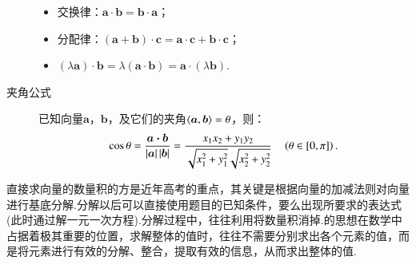 \begin{Theorem}[平面向量基本定理]
\begin{description}
        \begin{itemize}%
          \item 交换律：$\bm{a}\cdot\bm{b}=\bm{b}\cdot\bm{a}$；
          \item 分配律：$(\bm a+\bm b)\cdot \bm c=\bm a\cdot\bm c+\bm b\cdot \bm c$；
          \item $(\lambda \bm a)\cdot\bm{b}=\lambda(\bm a\cdot\bm b)=\bm{a}\cdot(\lambda\bm{b})$.
        \end{itemize}
      \item[夹角公式] 已知向量$\bm a$，$\bm b$，及它们的夹角$\langle \bm a,\bm b \rangle=\theta$，则：
      \[ \cos\theta=\dfrac{\bm{a}\bm{\cdot}\bm{b}}{\left| \bm{a} \right|\left| \bm{b} \right|}=\dfrac{x_1x_2+y_1y_2}{\sqrt{x_1^2+y_1^2}\sqrt{x_2^2+y_2^2}} \quad \left(\theta\in\left[0,\pi\right]\right).\]
    \end{description}\par
    {\kaishu 直接求向量的数量积的方是近年高考的重点，其关键是根据向量的加减法则对向量进行基底分解.分解以后可以直接使用题目的已知条件，要么出现所要求的表达式(此时通过解一元一次方程).分解过程中，往往利用将数量积消掉.的思想在数学中占据着极其重要的位置，求解整体的值时，往往不需要分别求出各个元素的值，而是将元素进行有效的分解、整合，提取有效的信息，从而求出整体的值.}

\end{Theorem}
